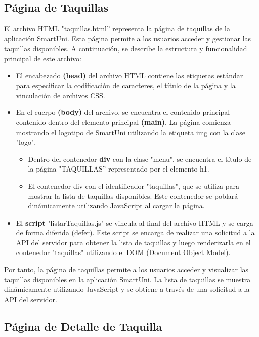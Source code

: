 \documentclass[12pt]{report}
\begin{document}
\subsection{Página de Taquillas}
El archivo HTML "taquillas.html'' representa la página de taquillas de la aplicación SmartUni. Esta página permite a los usuarios acceder y gestionar las taquillas disponibles. A continuación, se describe la estructura y funcionalidad principal de este archivo:

\begin{itemize}
    \item El encabezado\textbf{ (head)} del archivo HTML contiene las etiquetas estándar para especificar la codificación de caracteres, el título de la página y la vinculación de archivos CSS.

    \item En el cuerpo \textbf{(body)} del archivo, se encuentra el contenido principal contenido dentro del elemento principal \textbf{(main)}. La página comienza mostrando el logotipo de SmartUni utilizando la etiqueta img con la clase "logo".

    \begin{itemize}
        \item Dentro del contenedor \textbf{div} con la clase "menu", se encuentra el título de la página "TAQUILLAS'' representado por el elemento h1.
        
        \item El contenedor div con el identificador "taquillas", que se utiliza para mostrar la lista de taquillas disponibles. Este contenedor se poblará dinámicamente utilizando JavaScript al cargar la página.
    \end{itemize}

    \item El \textbf{script} "listarTaquillas.js" se vincula al final del archivo HTML y se carga de forma diferida (defer). Este script se encarga de realizar una solicitud a la API del servidor para obtener la lista de taquillas y luego renderizarla en el contenedor "taquillas" utilizando el DOM (Document Object Model).
\end{itemize}
Por tanto,  la página de taquillas permite a los usuarios acceder y visualizar las taquillas disponibles en la aplicación SmartUni. La lista de taquillas se muestra dinámicamente utilizando JavaScript y se obtiene a través de una solicitud a la API del servidor.

\subsection{Página de Detalle de Taquilla}
\end{document}
